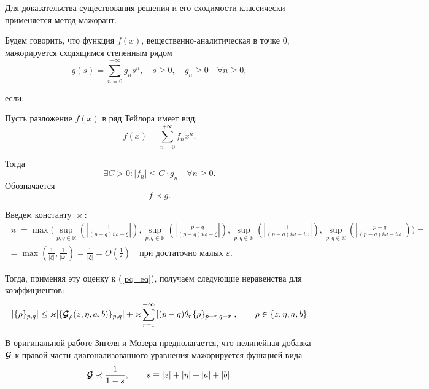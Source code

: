 Для доказательства существования решения и его сходимости классически применяется метод мажорант.

\begin{dfn}

Будем говорить, что функция $f(x)$, вещественно-аналитическая в точке 0, мажорируется сходящимся степенным рядом 
$$g(s) = \sum_{n=0}^{+\infty} g_n s^n, \quad s \ge 0, \quad g_n \ge 0 \quad \forall n \ge 0,$$

если:

\qquad Пусть разложение $f(x)$ в ряд Тейлора имеет вид:
$$f(x) = \sum_{n=0}^{+\infty} f_n x^n.$$ 

\qquad Тогда
$$\exists C>0: |f_n| \leq C \cdot g_n \quad \forall n \geq 0.$$
Обозначается
$$ f \prec g.$$


\end{dfn}


Введем константу $\varkappa$:
\begingroup
\footnotesize
\begin{multline*}
\varkappa = \max \Bigg( 
\sup_{p,q \in \mathbb{R}}\left( \left|\frac{1}{(p-q)i \omega - \xi} \right| \right), 
\sup_{p,q \in \mathbb{R}}\left( \left|\frac{p-q}{(p-q)i \omega - \xi} \right| \right),
\sup_{p,q \in \mathbb{R}}\left( \left|\frac{1}{(p-q)i \omega - i\omega} \right| \right), 
\sup_{p,q \in \mathbb{R}}\left( \left|\frac{p-q}{(p-q)i \omega - i\omega} \right| \right) \Bigg) = \\
= \max \left(\frac{1}{|\xi|}, \frac{1}{|\omega|} \right) = \frac{1}{|\xi|} = O \left( \frac{1}{\varepsilon} \right) \quad \text{при достаточно малых $\varepsilon$}.
\end{multline*}
\endgroup

Тогда, применяя эту оценку к (\ref{pq_eq}), получаем следующие неравенства для коэффициентов:
\begin{equation}
|\{\rho\}_{p,q}| \le \varkappa |\{\boldsymbol{\mathcal{G}}_\rho(z,\eta,a,b)\}_{p,q}| + \varkappa \sum_{r=1}^{+\infty}|{(p-q)\theta_r \{\rho\}_{p-r,q-r}}|, \qquad \rho \in \{z,\eta,a,b \}
\label{ineq_1}
\end{equation}

В оригинальной работе Зигеля и Мозера \cite{siegel} предполагается, что нелинейная добавка $\boldsymbol{\mathcal{G}}$ к правой части диагонализованного уравнения мажорируется функцией вида
\begin{align*}
\boldsymbol{\mathcal{G}}  \prec \frac{1}{1-s}, \qquad s \equiv |z|+|\eta|+|a|+|b|.
\end{align*}

